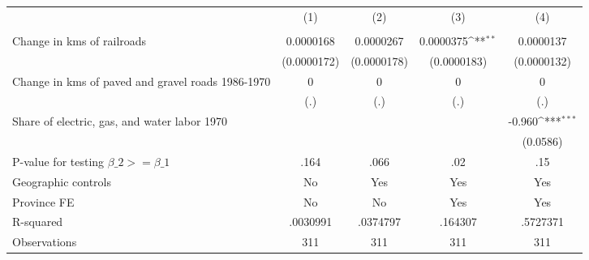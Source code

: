 {
\def\sym#1{\ifmmode^{#1}\else\(^{#1}\)\fi}
\begin{tabular}{l*{4}{c}}
\hline\hline
                &\multicolumn{1}{c}{(1)}&\multicolumn{1}{c}{(2)}&\multicolumn{1}{c}{(3)}&\multicolumn{1}{c}{(4)}\\
                &\multicolumn{1}{c}{}&\multicolumn{1}{c}{}&\multicolumn{1}{c}{}&\multicolumn{1}{c}{}\\
\hline
Change in kms of railroads&0.0000168         &0.0000267         &0.0000375\sym{**} &0.0000137         \\
                &(0.0000172)         &(0.0000178)         &(0.0000183)         &(0.0000132)         \\
[1em]
Change in kms of paved and gravel roads 1986-1970&        0         &        0         &        0         &        0         \\
                &      (.)         &      (.)         &      (.)         &      (.)         \\
[1em]
Share of electric, gas, and water labor 1970&                  &                  &                  &   -0.960\sym{***}\\
                &                  &                  &                  & (0.0586)         \\
\hline
P-value for testing $\beta\_{2} >= \beta\_{1}$&     .164         &     .066         &      .02         &      .15         \\
Geographic controls&       No         &      Yes         &      Yes         &      Yes         \\
Province FE     &       No         &       No         &      Yes         &      Yes         \\
R-squared       & .0030991         & .0374797         &  .164307         & .5727371         \\
Observations    &      311         &      311         &      311         &      311         \\
\hline\hline
\end{tabular}
}
